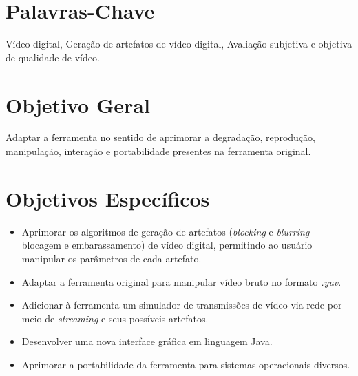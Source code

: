 \section{Palavras-Chave}
Vídeo digital, Geração de artefatos de vídeo digital, Avaliação subjetiva e objetiva de qualidade de vídeo.
\section{Objetivo Geral}
Adaptar a ferramenta  no sentido de aprimorar a degradação, reprodução, manipulação, interação e portabilidade  presentes na ferramenta original.
\section{Objetivos Específicos}
\begin{itemize}
	\item \textbf{} Aprimorar os algoritmos de geração de artefatos (\emph{blocking} e \emph{blurring} - blocagem e embarassamento) de vídeo digital, permitindo ao usuário manipular os parâmetros de cada artefato.
	\item \textbf{} Adaptar a ferramenta original para manipular vídeo bruto no formato \emph{.yuv}.
	\item \textbf{} Adicionar à ferramenta um simulador de transmissões de vídeo via rede por meio de \emph{streaming} e seus possíveis artefatos.
	\item \textbf{} Desenvolver uma nova interface gráfica em linguagem Java.
	\item \textbf{} Aprimorar a portabilidade da ferramenta para sistemas operacionais diversos.
\end{itemize}
